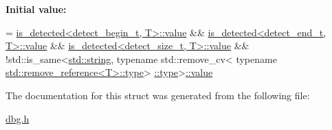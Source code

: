 {\bfseries Initial value\+:}
\begin{DoxyCode}
=
      \hyperlink{namespacetrimesh_ab10cc1052c9d1d1376d92211b6ca27dd}{is\_detected<detect\_begin\_t, T>::value} &&
      \hyperlink{namespacetrimesh_ab10cc1052c9d1d1376d92211b6ca27dd}{is\_detected<detect\_end\_t, T>::value} &&
      \hyperlink{namespacetrimesh_ab10cc1052c9d1d1376d92211b6ca27dd}{is\_detected<detect\_size\_t, T>::value} &&
      !std::is\_same<\hyperlink{namespacetrimesh_a51b4a31323874089623d4b17afabc1aa}{std::string},
                    \textcolor{keyword}{typename} std::remove\_cv<
                        \textcolor{keyword}{typename} \hyperlink{namespacetrimesh_aa726c5bf9cff74a26269e8d258ae9e3d}{std::remove\_reference<T>::type}>
      \hyperlink{namespacedbg_a2365d80e3a3525e6025040383ff8661b}{::type}>\hyperlink{structdbg_1_1detail_1_1is__container_aa9a4594488352384b65b36198ac414f8}{::value}
\end{DoxyCode}


The documentation for this struct was generated from the following file\+:\begin{DoxyCompactItemize}
\item 
\hyperlink{dbg_8h}{dbg.\+h}\end{DoxyCompactItemize}
